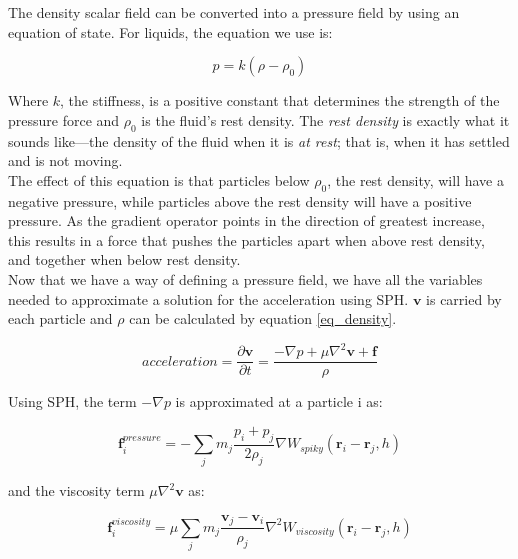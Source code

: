 \documentclass[]{article}
\begin{document}
	The density scalar field can be converted into a pressure field by using an equation of state. For liquids, the
	equation we use is:
	
	\begin{equation}
		\label{eq_densityToPressure}
		p = k(\rho - \rho_0)
	\end{equation}
	
	Where \( k \), the stiffness, is a positive constant that determines the strength of the pressure force and 
	\( \rho_0 \) is the fluid's rest density. The \textit{rest density} is exactly what it sounds like---the density of the 
	fluid when it is \textit{at rest}; that is, when it has settled and is not moving.\\
	
	The effect of this equation is that particles below \(\rho_0\), the rest density, will have a negative pressure, 
	while particles above the rest density will have a positive pressure. As the gradient operator points in the 
	direction of greatest increase, this results in a force that pushes the particles apart when above rest density,
	and together when below rest density.\\
	
	Now that we have a way of defining a pressure field, we have all the variables needed to approximate a solution
	for the acceleration using SPH. \(\mathbf{v}\) is carried by each particle and \(\rho\) can be calculated by 
	equation \ref{eq_density}.
	
	\begin{equation}
	acceleration = \frac{\partial \mathbf{v}}{\partial t} = \frac{- \nabla p + \mu \nabla ^2 \mathbf{v} + \mathbf{f}}{\rho}
	\end{equation}
	
	Using SPH, the term \(- \nabla p\) is approximated at a particle i as:
	
	\begin{equation}
		\mathbf{f}_{i}^{pressure} = - \sum_{j}^{} m_j \frac{p_i + p_j}{2 \rho_j} \nabla W_{spiky}(\mathbf{r}_i - \mathbf{r}_j, h)
	\end{equation}
	
	and the viscosity term \(\mu \nabla ^2 \mathbf{v} \) as:
	
	\begin{equation}
		\mathbf{f}_{i}^{viscosity} = \mu \sum_{j}^{} m_j \frac{ \mathbf{v}_j - \mathbf{v}_i}{\rho_j} \nabla ^ 2 W_{viscosity}(\mathbf{r}_i - \mathbf{r}_j, h)
	\end{equation}
	
\end{document}
